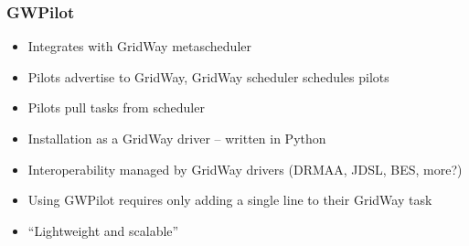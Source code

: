 \documentclass{sig-alternate}
\begin{document}

\subsubsection{GWPilot}

\begin{itemize}
\item Integrates with GridWay metascheduler
\item Pilots advertise to GridWay, GridWay scheduler schedules pilots
\item Pilots pull tasks from scheduler
\item Installation as a GridWay driver -- written in Python
\item Interoperability managed by GridWay drivers (DRMAA, JDSL, BES, more?)
\item Using GWPilot requires only adding a single line to their GridWay task
\item ``Lightweight and scalable''
\end{itemize}
\end{document}
